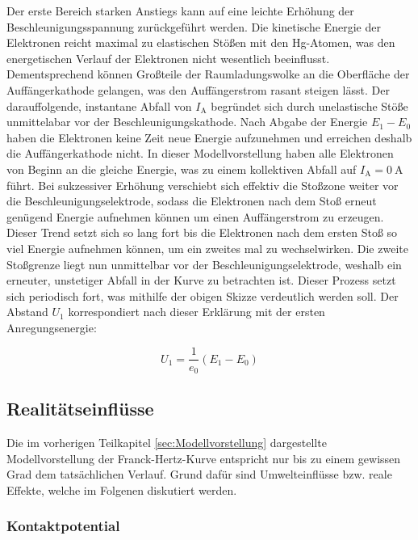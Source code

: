 \noindent Der erste Bereich starken Anstiegs kann auf eine leichte Erhöhung der Beschleunigungsspannung zurückgeführt werden. Die kinetische Energie der 
Elektronen reicht maximal zu elastischen Stößen mit den Hg-Atomen, was den energetischen Verlauf der Elektronen nicht wesentlich beeinflusst. Dementsprechend 
können Großteile der Raumladungswolke an die Oberfläche der Auffängerkathode gelangen, was den Auffängerstrom rasant steigen lässt. Der darauffolgende,
instantane Abfall von $I_\text{A}$ begründet sich durch unelastische Stöße unmittelabar vor der Beschleunigungskathode. Nach Abgabe der Energie $E_1 - E_0$
haben die Elektronen keine Zeit neue Energie aufzunehmen und erreichen deshalb die Auffängerkathode nicht. In dieser Modellvorstellung haben alle Elektronen 
von Beginn an die gleiche Energie, was zu einem kollektiven Abfall auf $I_\text{A} = \qty{0}{\ampere}$ führt. Bei sukzessiver Erhöhung verschiebt sich effektiv 
die Stoßzone weiter vor die Beschleunigungselektrode, sodass die Elektronen nach dem Stoß erneut genügend Energie aufnehmen können um einen Auffängerstrom 
zu erzeugen. Dieser Trend setzt sich so lang fort bis die Elektronen nach dem ersten Stoß so viel Energie aufnehmen können, um ein zweites mal zu wechselwirken.
Die zweite Stoßgrenze liegt nun unmittelbar vor der Beschleunigungselektrode, weshalb ein erneuter, unstetiger Abfall in der Kurve zu betrachten ist. Dieser 
Prozess setzt sich periodisch fort, was mithilfe der obigen Skizze verdeutlich werden soll. Der Abstand $U_1$ korrespondiert nach dieser Erklärung mit 
der ersten Anregungsenergie:

\begin{equation*}
    U_1 = \frac{1}{e_0}\left(E_1 - E_0\right)
\end{equation*}

\subsection{Realitätseinflüsse}
\label{sec:Realitaetseinfluesse}

Die im vorherigen Teilkapitel \ref{sec:Modellvorstellung} dargestellte Modellvorstellung der Franck-Hertz-Kurve entspricht nur bis zu einem gewissen Grad dem 
tatsächlichen Verlauf. Grund dafür sind Umwelteinflüsse bzw. reale Effekte, welche im Folgenen diskutiert werden.\\

\subsubsection*{Kontaktpotential}

